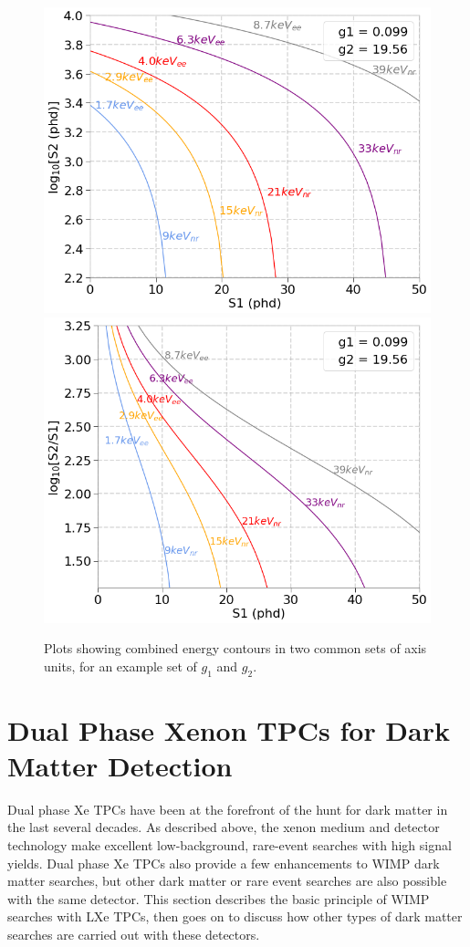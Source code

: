 \begin{figure}[htbp]
\begin{center}
\includegraphics[width=\halffig]{figures/lxetpcs/E_contours.png}
\includegraphics[width=\halffig]{figures/lxetpcs/E_contours2.png}
\caption{Plots showing combined energy contours in two common sets of axis units, for an example set of $g_{1}$ and $g_{2}$.}
\label{fig:e_contours}
\end{center}
\end{figure}


\section{Dual Phase Xenon TPCs for Dark Matter Detection}
Dual phase Xe \ac{TPC}s have been at the forefront of the hunt for dark matter in the last several decades. As described above, the xenon medium and detector technology make excellent low-background, rare-event searches with high signal yields. Dual phase Xe \ac{TPC}s also provide a few enhancements to \ac{WIMP} dark matter searches, but other dark matter or rare event searches are also possible with the same detector. This section describes the basic principle of \ac{WIMP} searches with \ac{LXe} \ac{TPC}s, then goes on to discuss how other types of dark matter searches are carried out with these detectors.


